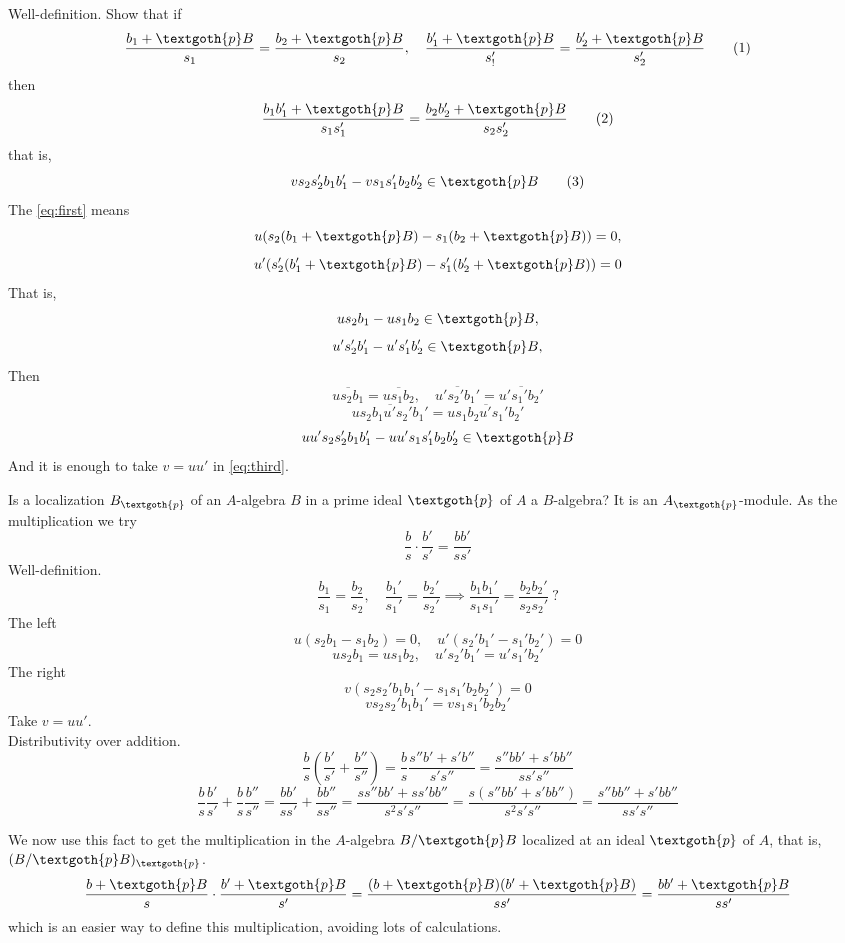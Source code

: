 \documentclass{article}
\begin{document}
Well-definition. Show that if
\[
\frac{b_1 + \textgoth{p}B}{s_1} = \frac{b_2 + \textgoth{p}B}{s_2}, \quad
\frac{b'_1 + \textgoth{p}B}{s'_!} = \frac{b'_2 + \textgoth{p}B}{s'_2} \tag{1}\label{eq:first}
\]
then
\[
\frac{b_1 b'_1 + \textgoth{p}B}{s_1 s'_1} = \frac{b_2 b'_2 + \textgoth{p}B}{s_2 s'_2} 
\tag{2}\label{eq:second}
\]
that is,
\[
v s_2 s_2' b_1 b_1' - v s_1 s_1' b_2 b_2' \in \textgoth{p}B
\tag{3}\label{eq:third}
\]
The \eqref{eq:first} means
\[
u(s_2(b_1 + \textgoth{p}B) - s_1(b_2 + \textgoth{p}B)) = 0, 
\]
\[
u'(s_2'(b_1' + \textgoth{p}B) - s_1'(b_2' + \textgoth{p}B)) = 0
\]
That is,
\[
u s_2 b_1 - u s_1 b_2 \in \textgoth{p}B,
\]
\[
u' s_2' b_1' - u' s_1' b_2' \in \textgoth{p}B,
\]
Then
\[
\overline{u s_2 b_1} = \overline{u s_1 b_2}, \quad 
\overline{u' s_2' b_1'} = \overline{u' s_1' b_2'}
\]
\[
\overline{u s_2 b_1 u' s_2' b_1'} =
\overline{u s_1 b_2 u' s_1' b_2'}
\]
\[
u u' s_2 s_2' b_1 b_1' - u u' s_1 s_1' b_2 b_2' \in  \textgoth{p}B
\]
And it is enough to take $v = u u'$ in \eqref{eq:third}.

Is a localization $B_\textgoth{p}$ of an $A$-algebra $B$ in a prime ideal $\textgoth{p}$ of $A$ a $B$-algebra? It is an $A_\textgoth{p}$-module. As the multiplication we try
\[
\frac{b}{s} \cdot \frac{b'}{s'} = \frac{b b'}{s s'}
\]
Well-definition.
\[
\frac{b_1}{s_1} = \frac{b_2}{s_2}, \quad \frac{b_1'}{s_1'} = \frac{b_2'}{s_2'} 
\implies
\frac{b_1 b_1'}{s_1 s_1'} = \frac{b_2 b_2'}{s_2 s_2'} \ ?
\]
The left
\[
u(s_2 b_1 - s_1 b_2) = 0, \quad u'(s_2' b_1' - s_1' b_2') = 0
\]
\[
u s_2 b_1 = u s_1 b_2, \quad u' s_2' b_1' = u' s_1' b_2'
\]
The right
\[
v(s_2 s_2' b_1 b_1' - s_1 s_1' b_2 b_2') = 0
\]
\[
v s_2 s_2' b_1 b_1' = v s_1 s_1' b_2 b_2'
\]
Take $v = u u'$. \\
Distributivity over addition.
\[
\frac{b}{s} \left( \frac{b'}{s'} + \frac{b''}{s''} \right) = 
\frac{b}{s} \frac{s'' b' + s' b''}{s' s''} = \frac{s'' b b' + s' b b''}{s s' s''}
\]
\[
\frac{b}{s}\frac{b'}{s'} + \frac{b}{s}\frac{b''}{s''} = 
\frac{b b'}{s s'} + \frac{b b''}{s s''} = \frac{s s'' b b' + s s' b b''}{s^2 s' s''} =
\frac{s(s'' b b' + s' b b'')}{s^2 s' s''} = 
\frac{s'' b b'' + s' b b''}{s s' s''}
\]

We now use this fact to get the multiplication in the $A$-algebra $B/\textgoth{p}B$ localized at an ideal $\textgoth{p}$ of $A$, that is, $(B/\textgoth{p}B)_\textgoth{p}$.
\[
\frac{b + \textgoth{p}B}{s} \cdot \frac{b' + \textgoth{p}B}{s'} = 
\frac{(b + \textgoth{p}B)(b' + \textgoth{p}B)}{s s'} = 
\frac{b b' + \textgoth{p}B}{s s'}
\]
which is an easier way to define this multiplication, avoiding lots of calculations.
\end{document}
